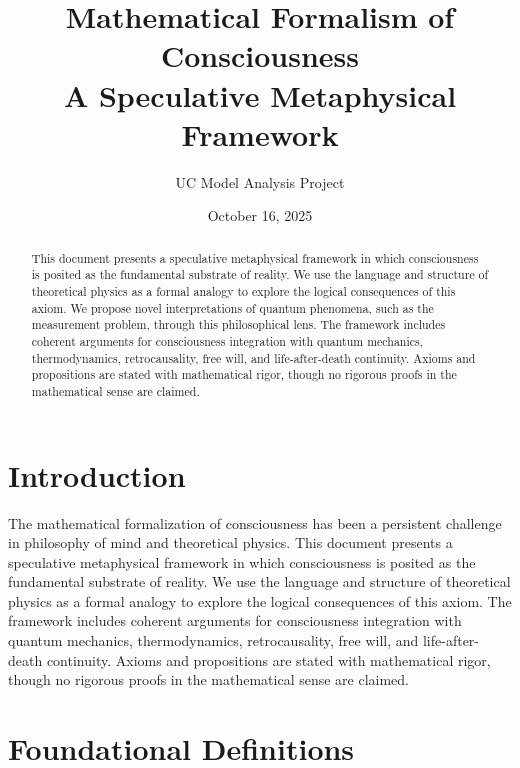 \documentclass[12pt,a4paper]{article}
\title{\textbf{Mathematical Formalism of Consciousness} \\ \normalsize A Speculative Metaphysical Framework}
\author{UC Model Analysis Project}
\date{October 16, 2025}
\theoremstyle{definition}
\begin{document}
\maketitle

\begin{abstract}
This document presents a speculative metaphysical framework in which consciousness is posited as the fundamental substrate of reality. We use the language and structure of theoretical physics as a formal analogy to explore the logical consequences of this axiom. We propose novel interpretations of quantum phenomena, such as the measurement problem, through this philosophical lens. The framework includes coherent arguments for consciousness integration with quantum mechanics, thermodynamics, retrocausality, free will, and life-after-death continuity. Axioms and propositions are stated with mathematical rigor, though no rigorous proofs in the mathematical sense are claimed.
\end{abstract}

\newpage
\newpage

\section{Introduction}

The mathematical formalization of consciousness has been a persistent challenge in philosophy of mind and theoretical physics. This document presents a speculative metaphysical framework in which consciousness is posited as the fundamental substrate of reality. We use the language and structure of theoretical physics as a formal analogy to explore the logical consequences of this axiom. The framework includes coherent arguments for consciousness integration with quantum mechanics, thermodynamics, retrocausality, free will, and life-after-death continuity. Axioms and propositions are stated with mathematical rigor, though no rigorous proofs in the mathematical sense are claimed.

\section{Foundational Definitions}
\end{document}

